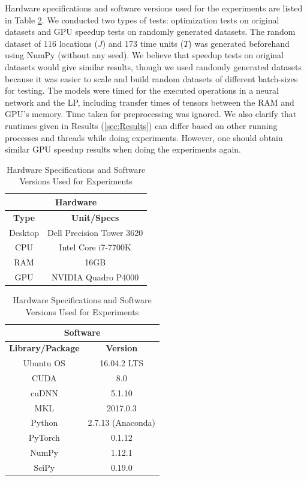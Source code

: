 \documentclass[12pt]{article}
\begin{document}
    Hardware specifications and software versions used for the experiments are listed in Table \ref{tab:Hardware Specifications and Software Versions Used for Experiments}. We conducted two types of tests: optimization tests on original datasets and GPU speedup tests on randomly generated datasets. The random dataset of 116 locations ($J$) and 173 time units ($T$) was generated beforehand using NumPy (without any seed). We believe that speedup tests on original datasets would give similar results, though we used randomly generated datasets because it was easier to scale and build random datasets of different batch-sizes for testing. The models were timed for the executed operations in a neural network and the LP, including transfer times of tensors between the RAM and GPU's memory. Time taken for preprocessing was ignored. We also clarify that runtimes given in Results (\cref{sec:Results}) can differ based on other running processes and threads while doing experiments. However, one should obtain similar GPU speedup results when doing the experiments again.
    \begin{table}[!htbp]
        \centering
        \caption{Hardware Specifications and Software Versions Used for Experiments}
        \label{tab:Hardware Specifications and Software Versions Used for Experiments}
        \begin{tabular}{|c|c|}
            \hline
            \multicolumn{2}{c}{\textbf{Hardware}}\\
            \hline
            \textbf{Type} & \textbf{Unit/Specs}\\
            \hline
            Desktop & Dell Precision Tower 3620\\
            CPU & Intel Core i7-7700K\\
            RAM & 16GB\\
            GPU & NVIDIA Quadro P4000\\
            \hline
        \end{tabular}\quad
        \begin{tabular}{|c|c|}
            \hline
            \multicolumn{2}{c}{\textbf{Software}}\\
            \hline
            \textbf{Library/Package} & \textbf{Version}\\
            \hline
            Ubuntu OS & 16.04.2 LTS\\
            CUDA & 8.0\\
            cuDNN & 5.1.10\\
            MKL & 2017.0.3\\
            Python & 2.7.13 (Anaconda)\\
            PyTorch & 0.1.12\textunderscore2\\
            NumPy & 1.12.1\\
            SciPy & 0.19.0\\
            \hline
        \end{tabular}
    \end{table}
    
\end{document}
